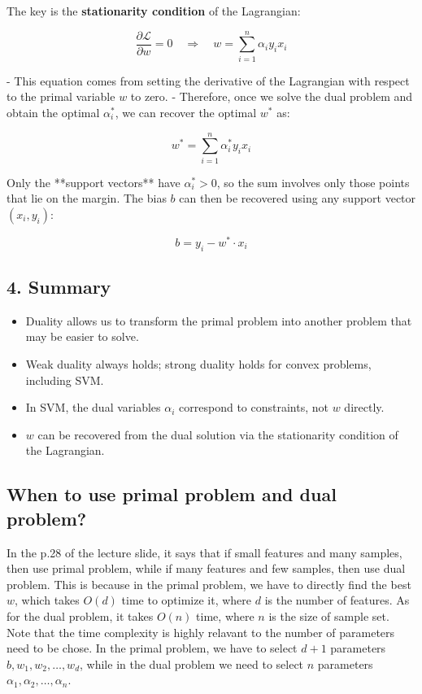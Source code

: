 The key is the \textbf{stationarity condition} of the Lagrangian:

\[
\frac{\partial \mathcal{L}}{\partial w} = 0 \quad \Rightarrow \quad w = \sum_{i=1}^n \alpha_i y_i x_i
\]

- This equation comes from setting the derivative of the Lagrangian with respect to the primal variable $w$ to zero.  
- Therefore, once we solve the dual problem and obtain the optimal $\alpha_i^*$, we can recover the optimal $w^*$ as:

\[
w^* = \sum_{i=1}^n \alpha_i^* y_i x_i
\]

Only the **support vectors** have $\alpha_i^* > 0$, so the sum involves only those points that lie on the margin.  
The bias $b$ can then be recovered using any support vector $(x_i, y_i)$:

\[
b = y_i - w^* \cdot x_i
\]

\subsection*{4. Summary}

\begin{itemize}
    \item Duality allows us to transform the primal problem into another problem that may be easier to solve.
    \item Weak duality always holds; strong duality holds for convex problems, including SVM.
    \item In SVM, the dual variables $\alpha_i$ correspond to constraints, not $w$ directly.
    \item $w$ can be recovered from the dual solution via the stationarity condition of the Lagrangian.
\end{itemize}

\subsection{When to use primal problem and dual problem?}
In the p.28 of the lecture slide, it says that if small features and many samples, then use primal problem, while if many features and few samples, then use dual problem. This is because in the primal problem, we have to directly find the best \(w\), which takes \(O(d)\) time to optimize it, where \(d\) is the number of features. As for the dual problem, it takes \(O(n)\) time, where \(n\) is the size of sample set. Note that the time complexity is highly relavant to the number of parameters need to be chose. In the primal problem, we have to select \(d + 1\) parameters \(b, w_1, w_2, \dots , w_d\), while in the dual problem we need to select \(n\) parameters \(\alpha _1, \alpha _2, \dots , \alpha _n\).       

